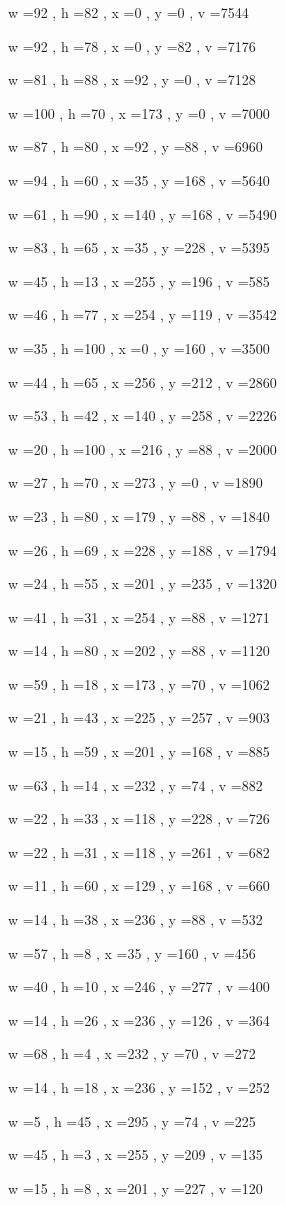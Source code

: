 \documentclass[11pt]{article}
\begin{document}
w =92 , h =82 , x =0 , y =0 , v =7544
\par
w =92 , h =78 , x =0 , y =82 , v =7176
\par
w =81 , h =88 , x =92 , y =0 , v =7128
\par
w =100 , h =70 , x =173 , y =0 , v =7000
\par
w =87 , h =80 , x =92 , y =88 , v =6960
\par
w =94 , h =60 , x =35 , y =168 , v =5640
\par
w =61 , h =90 , x =140 , y =168 , v =5490
\par
w =83 , h =65 , x =35 , y =228 , v =5395
\par
w =45 , h =13 , x =255 , y =196 , v =585
\par
w =46 , h =77 , x =254 , y =119 , v =3542
\par
w =35 , h =100 , x =0 , y =160 , v =3500
\par
w =44 , h =65 , x =256 , y =212 , v =2860
\par
w =53 , h =42 , x =140 , y =258 , v =2226
\par
w =20 , h =100 , x =216 , y =88 , v =2000
\par
w =27 , h =70 , x =273 , y =0 , v =1890
\par
w =23 , h =80 , x =179 , y =88 , v =1840
\par
w =26 , h =69 , x =228 , y =188 , v =1794
\par
w =24 , h =55 , x =201 , y =235 , v =1320
\par
w =41 , h =31 , x =254 , y =88 , v =1271
\par
w =14 , h =80 , x =202 , y =88 , v =1120
\par
w =59 , h =18 , x =173 , y =70 , v =1062
\par
w =21 , h =43 , x =225 , y =257 , v =903
\par
w =15 , h =59 , x =201 , y =168 , v =885
\par
w =63 , h =14 , x =232 , y =74 , v =882
\par
w =22 , h =33 , x =118 , y =228 , v =726
\par
w =22 , h =31 , x =118 , y =261 , v =682
\par
w =11 , h =60 , x =129 , y =168 , v =660
\par
w =14 , h =38 , x =236 , y =88 , v =532
\par
w =57 , h =8 , x =35 , y =160 , v =456
\par
w =40 , h =10 , x =246 , y =277 , v =400
\par
w =14 , h =26 , x =236 , y =126 , v =364
\par
w =68 , h =4 , x =232 , y =70 , v =272
\par
w =14 , h =18 , x =236 , y =152 , v =252
\par
w =5 , h =45 , x =295 , y =74 , v =225
\par
w =45 , h =3 , x =255 , y =209 , v =135
\par
w =15 , h =8 , x =201 , y =227 , v =120
\par
\newpage
\end{document}
